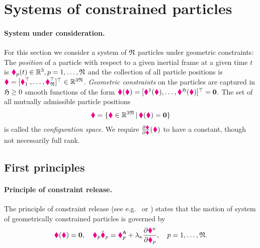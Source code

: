 \section{Systems of constrained particles}\label{sec:MechConstrainedParticles}

\paragraph{System under consideration.} For this section we consider a system of $\numParticles$ particles under geometric constraints:
The \textit{position} of a particle with respect to a given inertial frame at a given time $t$ is $\particlePos{\PidxI}(t) \in \RealNum^3, \PidxI = 1,\ldots,\numParticles$ and the collection of all particle positions is $\particleCoord = [\particlePos{1}^\top,\ldots,\particlePos{\numParticles}^\top]^\top \in \RealNum^{3\numParticles}$.
\textit{Geometric constraints} on the particles are captured in $\numParticleConstraints \geq 0$ smooth functions of the form $\particleGeoConstraint(\particleCoord) = [\particleGeoConstraintCoeff{1}(\particleCoord), \ldots, \particleGeoConstraintCoeff{\numParticleConstraints}(\particleCoord)]^\top = \tuple{0}$.
The set of all mutually admissible particle positions 
\begin{align}
\particleConfigSpace = \{ \particleCoord \in \RealNum^{3\numParticles} \, | \, \particleGeoConstraint(\particleCoord) = \tuple{0} \} 
\end{align}
is called the \textit{configuration space}.
We require $\pdiff[\particleGeoConstraint]{\particleCoord}(\particleCoord)$ to have a constant, though not necessarily full rank.

\subsection{First principles}
\paragraph{Principle of constraint release.} 
The principle of constraint release (see e.g.\ \cite[sec.\ 32]{Hamel:TheoretischeMechanik} or \cite[sec.\ 6.1]{Lurie:AnalyticalMechanics}) states that the motion of system of geometrically constrained particles is governed by
\begin{align}\label{eq:ConstraintRelease}
 \particleGeoConstraint(\particleCoord) = \tuple{0}, 
\quad
 \particleMass{\PidxI} \particlePosdd{\PidxI} = \particleForceImpressed{\PidxI} + \LagrangeMultCoeff{\CidxI} \pdiff[\particleGeoConstraintCoeff{\CidxI}]{\particlePos{\PidxI}},
\quad \PidxI = 1,\ldots,\numParticles.
\end{align}

